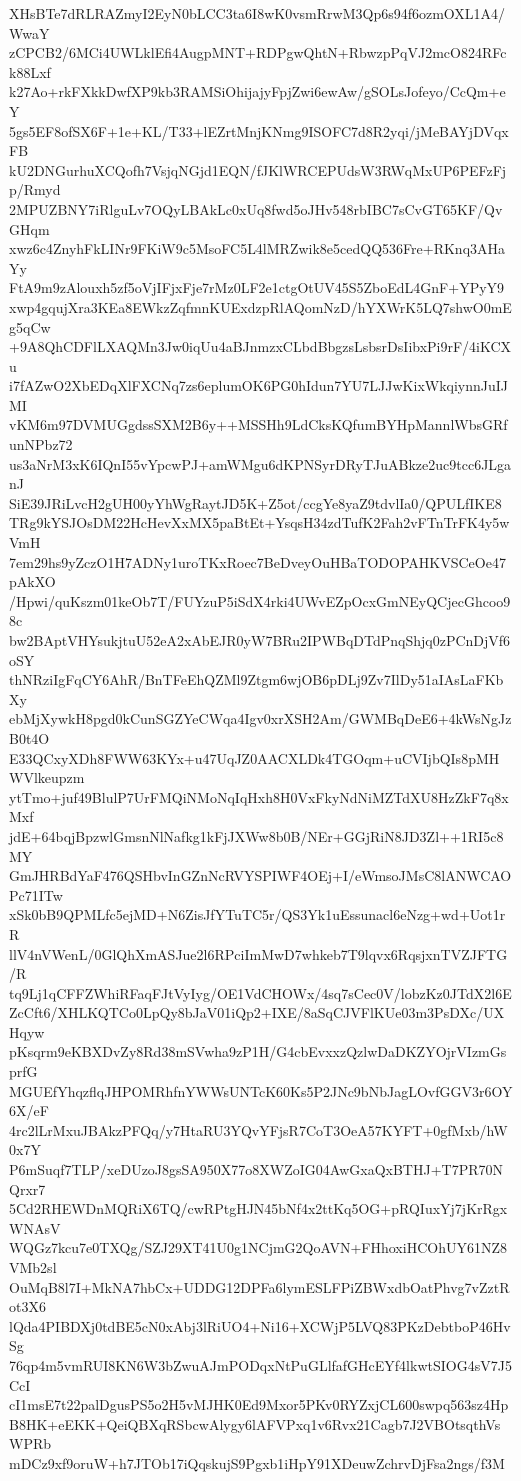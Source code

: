 XHsBTe7dRLRAZmyI2EyN0bLCC3ta6I8wK0vsmRrwM3Qp6s94f6ozmOXL1A4/WwaY
zCPCB2/6MCi4UWLklEfi4AugpMNT+RDPgwQhtN+RbwzpPqVJ2mcO824RFck88Lxf
k27Ao+rkFXkkDwfXP9kb3RAMSiOhijajyFpjZwi6ewAw/gSOLsJofeyo/CcQm+eY
5gs5EF8ofSX6F+1e+KL/T33+lEZrtMnjKNmg9ISOFC7d8R2yqi/jMeBAYjDVqxFB
kU2DNGurhuXCQofh7VsjqNGjd1EQN/fJKlWRCEPUdsW3RWqMxUP6PEFzFjp/Rmyd
2MPUZBNY7iRlguLv7OQyLBAkLc0xUq8fwd5oJHv548rbIBC7sCvGT65KF/QvGHqm
xwz6c4ZnyhFkLINr9FKiW9c5MsoFC5L4lMRZwik8e5cedQQ536Fre+RKnq3AHaYy
FtA9m9zAlouxh5zf5oVjIFjxFje7rMz0LF2e1ctgOtUV45S5ZboEdL4GnF+YPyY9
xwp4gqujXra3KEa8EWkzZqfmnKUExdzpRlAQomNzD/hYXWrK5LQ7shwO0mEg5qCw
+9A8QhCDFlLXAQMn3Jw0iqUu4aBJnmzxCLbdBbgzsLsbsrDsIibxPi9rF/4iKCXu
i7fAZwO2XbEDqXlFXCNq7zs6eplumOK6PG0hIdun7YU7LJJwKixWkqiynnJuIJMI
vKM6m97DVMUGgdssSXM2B6y++MSSHh9LdCksKQfumBYHpMannlWbsGRfunNPbz72
us3aNrM3xK6IQnI55vYpcwPJ+amWMgu6dKPNSyrDRyTJuABkze2uc9tcc6JLganJ
SiE39JRiLvcH2gUH00yYhWgRaytJD5K+Z5ot/ccgYe8yaZ9tdvlIa0/QPULfIKE8
TRg9kYSJOsDM22HcHevXxMX5paBtEt+YsqsH34zdTufK2Fah2vFTnTrFK4y5wVmH
7em29hs9yZczO1H7ADNy1uroTKxRoec7BeDveyOuHBaTODOPAHKVSCeOe47pAkXO
/Hpwi/quKszm01keOb7T/FUYzuP5iSdX4rki4UWvEZpOcxGmNEyQCjecGhcoo98c
bw2BAptVHYsukjtuU52eA2xAbEJR0yW7BRu2IPWBqDTdPnqShjq0zPCnDjVf6oSY
thNRziIgFqCY6AhR/BnTFeEhQZMl9Ztgm6wjOB6pDLj9Zv7IlDy51aIAsLaFKbXy
ebMjXywkH8pgd0kCunSGZYeCWqa4Igv0xrXSH2Am/GWMBqDeE6+4kWsNgJzB0t4O
E33QCxyXDh8FWW63KYx+u47UqJZ0AACXLDk4TGOqm+uCVIjbQIs8pMHWVlkeupzm
ytTmo+juf49BlulP7UrFMQiNMoNqIqHxh8H0VxFkyNdNiMZTdXU8HzZkF7q8xMxf
jdE+64bqjBpzwlGmsnNlNafkg1kFjJXWw8b0B/NEr+GGjRiN8JD3Zl++1RI5c8MY
GmJHRBdYaF476QSHbvInGZnNcRVYSPIWF4OEj+I/eWmsoJMsC8lANWCAOPc71ITw
xSk0bB9QPMLfc5ejMD+N6ZisJfYTuTC5r/QS3Yk1uEssunacl6eNzg+wd+Uot1rR
llV4nVWenL/0GlQhXmASJue2l6RPciImMwD7whkeb7T9lqvx6RqsjxnTVZJFTG/R
tq9Lj1qCFFZWhiRFaqFJtVyIyg/OE1VdCHOWx/4sq7sCec0V/lobzKz0JTdX2l6E
ZcCft6/XHLKQTCo0LpQy8bJaV01iQp2+IXE/8aSqCJVFlKUe03m3PsDXc/UXHqyw
pKsqrm9eKBXDvZy8Rd38mSVwha9zP1H/G4cbEvxxzQzlwDaDKZYOjrVIzmGsprfG
MGUEfYhqzflqJHPOMRhfnYWWsUNTcK60Ks5P2JNc9bNbJagLOvfGGV3r6OY6X/eF
4rc2lLrMxuJBAkzPFQq/y7HtaRU3YQvYFjsR7CoT3OeA57KYFT+0gfMxb/hW0x7Y
P6mSuqf7TLP/xeDUzoJ8gsSA950X77o8XWZoIG04AwGxaQxBTHJ+T7PR70NQrxr7
5Cd2RHEWDnMQRiX6TQ/cwRPtgHJN45bNf4x2ttKq5OG+pRQIuxYj7jKrRgxWNAsV
WQGz7kcu7e0TXQg/SZJ29XT41U0g1NCjmG2QoAVN+FHhoxiHCOhUY61NZ8VMb2sl
OuMqB8l7I+MkNA7hbCx+UDDG12DPFa6lymESLFPiZBWxdbOatPhvg7vZztRot3X6
lQda4PIBDXj0tdBE5cN0xAbj3lRiUO4+Ni16+XCWjP5LVQ83PKzDebtboP46HvSg
76qp4m5vmRUI8KN6W3bZwuAJmPODqxNtPuGLlfafGHcEYf4lkwtSIOG4sV7J5CcI
cI1msE7t22palDgusPS5o2H5vMJHK0Ed9Mxor5PKv0RYZxjCL600swpq563sz4Hp
B8HK+eEKK+QeiQBXqRSbcwAlygy6lAFVPxq1v6Rvx21Cagb7J2VBOtsqthVsWPRb
mDCz9xf9oruW+h7JTOb17iQqskujS9Pgxb1iHpY91XDeuwZchrvDjFsa2ngs/f3M
